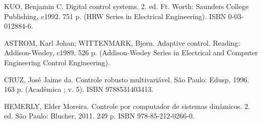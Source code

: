 {{    KUO, Benjamin C. Digital control systems. 2. ed. Ft. Worth: Saunders College Publishing, c1992. 751 p. (HRW Series in Electrical Engineering). ISBN 0-03-012884-6.

    ASTROM, Karl Johan; WITTENMARK, Bjorn. Adaptive control. Reading: Addison-Wesley, c1989. 526 p. (Addison-Wesley Series in Electrical and Computer Engineering Control Engineering).

    CRUZ, José Jaime da. Controle robusto multivariável. São Paulo: Edusp, 1996. 163 p. (Acadêmica ; v. 5). ISBN 9788531403413.

    HEMERLY, Elder Moreira. Controle por computador de sistemas dinâmicos. 2. ed. São Paulo: Blucher, 2011. 249 p. ISBN 978-85-212-0266-0.
    }


}